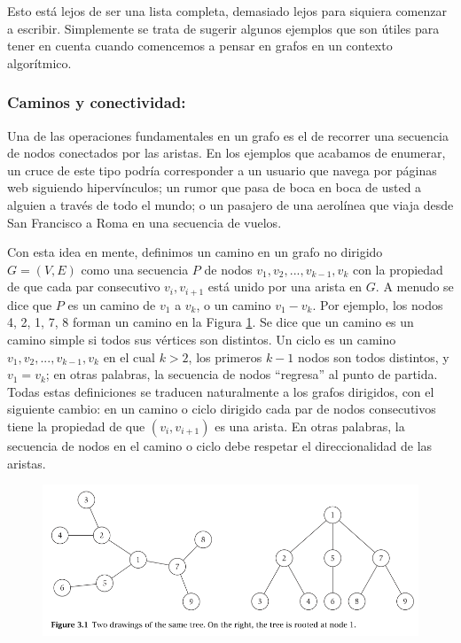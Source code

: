 \documentclass[a4paper, 12pt]{book}
\theoremstyle{dotless}
\begin{document}
Esto está lejos de ser una lista completa, demasiado lejos para siquiera comenzar a escribir. Simplemente se trata de sugerir algunos ejemplos que son útiles para tener en cuenta cuando comencemos a pensar en grafos en un contexto algorítmico.

\subsubsection{Caminos y conectividad:} 
Una de las operaciones fundamentales en un grafo es el de recorrer una secuencia de nodos conectados por las aristas. 
En los ejemplos que acabamos de enumerar, un cruce de este tipo podría corresponder a un usuario que navega por páginas web siguiendo hipervínculos; 
un rumor que pasa de boca en boca de usted a alguien a través de todo el mundo; 
o un pasajero de una aerolínea que viaja desde San Francisco a Roma en una secuencia de vuelos.

Con esta idea en mente, definimos un camino en un grafo no dirigido
$G = (V, E)$ como una secuencia $P$ de nodos $v_1, v_2, ..., v_{k-1},v_k$ con la propiedad de que cada par consecutivo $v_i, v_{i+1}$ está unido por una arista en $G$. A menudo se dice que $P$ es un camino de $v_1$ a $v_k$, o un camino $v_1-v_k$. Por ejemplo, los nodos 4, 2, 1, 7, 8 forman un camino en la Figura \ref{fig:Imagenes-Seccion3/fig3_1.PNG}. 
Se dice que un camino es un camino simple si todos sus vértices son distintos. 
Un ciclo es un camino $v_1, v_2, ..., v_{k-1}, v_k$ en el cual $k>2$, los primeros $k-1$ nodos son todos distintos, y $v_1=v_k$; en otras palabras, la secuencia de nodos ``regresa'' al punto de partida. 
Todas estas definiciones se traducen naturalmente a los grafos dirigidos, con el siguiente cambio: en un camino o ciclo dirigido cada par de nodos consecutivos tiene la propiedad de que $(v_i, v_{i+1})$ es una arista. En otras palabras, la secuencia de nodos en el camino o ciclo debe respetar el direccionalidad de las aristas.

\begin{figure}[t]
\centering
\includegraphics[width=1\textwidth]{Imagenes-Seccion3/fig3_1.PNG}
\caption{ }
 \label{fig:Imagenes-Seccion3/fig3_1.PNG}
\end{figure}
\end{document}
